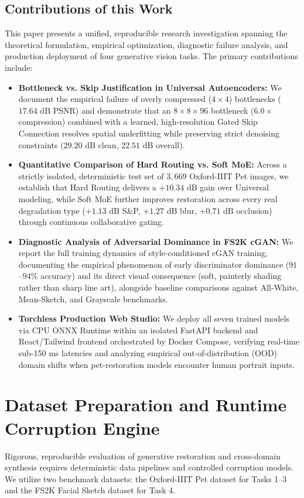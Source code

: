 \documentclass[conference]{IEEEtran}
\begin{document}
\subsection{Contributions of this Work}
This paper presents a unified, reproducible research investigation spanning the theoretical formulation, empirical optimization, diagnostic failure analysis, and production deployment of four generative vision tasks. The primary contributions include:
\begin{itemize}
    \item \textbf{Bottleneck vs. Skip Justification in Universal Autoencoders:} We document the empirical failure of overly compressed ($4\times 4$) bottlenecks ($17.64\text{ dB}$ PSNR) and demonstrate that an $8\times 8\times 96$ bottleneck ($6.0\times$ compression) combined with a learned, high-resolution Gated Skip Connection resolves spatial underfitting while preserving strict denoising constraints ($29.20\text{ dB}$ clean, $22.51\text{ dB}$ overall).
    \item \textbf{Quantitative Comparison of Hard Routing vs. Soft MoE:} Across a strictly isolated, deterministic test set of $3,669$ Oxford-IIIT Pet images, we establish that Hard Routing delivers a $+10.34\text{ dB}$ gain over Universal modeling, while Soft MoE further improves restoration across every real degradation type ($+1.13\text{ dB}$ S\&P, $+1.27\text{ dB}$ blur, $+0.71\text{ dB}$ occlusion) through continuous collaborative gating.
    \item \textbf{Diagnostic Analysis of Adversarial Dominance in FS2K cGAN:} We report the full training dynamics of style-conditioned cGAN training, documenting the empirical phenomenon of early discriminator dominance ($91$--$94\%$ accuracy) and its direct visual consequence (soft, painterly shading rather than sharp line art), alongside baseline comparisons against All-White, Mean-Sketch, and Grayscale benchmarks.
    \item \textbf{Torchless Production Web Studio:} We deploy all seven trained models via CPU ONNX Runtime within an isolated FastAPI backend and React/Tailwind frontend orchestrated by Docker Compose, verifying real-time sub-150 ms latencies and analyzing empirical out-of-distribution (OOD) domain shifts when pet-restoration models encounter human portrait inputs.
\end{itemize}

\section{Dataset Preparation and Runtime Corruption Engine}
Rigorous, reproducible evaluation of generative restoration and cross-domain synthesis requires deterministic data pipelines and controlled corruption models. We utilize two benchmark datasets: the Oxford-IIIT Pet dataset \cite{parkhi2012cats} for Tasks 1--3 and the FS2K Facial Sketch dataset \cite{fan2022facial} for Task 4.
\end{document}
